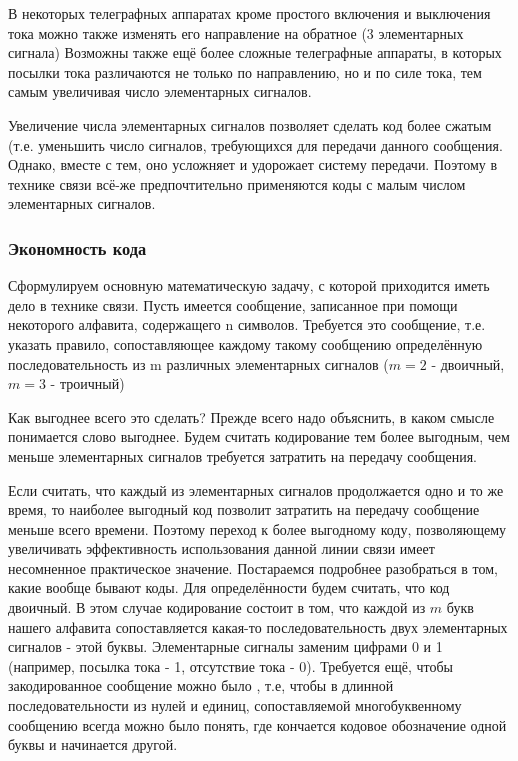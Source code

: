 \documentclass[a4paper,12pt]{report}
\begin{document}
	В некоторых телеграфных аппаратах кроме простого включения и выключения тока можно также изменять его направление на обратное (3 элементарных сигнала) Возможны также ещё более сложные телеграфные аппараты, в которых посылки тока различаются не только по направлению, но и по силе тока, тем самым увеличивая число элементарных сигналов.
	
	Увеличение числа элементарных сигналов позволяет сделать код более сжатым (т.е. уменьшить число сигналов, требующихся для передачи данного сообщения. Однако, вместе с тем, оно усложняет и удорожает систему передачи. Поэтому в технике связи всё-же предпочтительно применяются коды с малым числом элементарных сигналов.
		

	\subsubsection{Экономность кода}
	
	Сформулируем основную математическую задачу, с которой приходится иметь дело в технике связи. Пусть имеется сообщение, записанное при помощи некоторого алфавита, содержащего n символов. Требуется  это сообщение, т.е. указать правило, сопоставляющее каждому такому сообщению определённую последовательность из m различных элементарных сигналов ($m=2$ - двоичный, $m=3$ - троичный)
	
	Как выгоднее всего это сделать?  Прежде всего надо объяснить, в каком смысле понимается слово выгоднее. Будем считать кодирование тем более выгодным, чем меньше элементарных сигналов требуется затратить на передачу сообщения. 
	
	Если считать, что каждый из элементарных сигналов продолжается одно и то же время, то наиболее выгодный код позволит затратить на передачу сообщение меньше всего времени. Поэтому переход к более выгодному коду, позволяющему увеличивать эффективность использования данной линии связи имеет несомненное практическое значение. Постараемся подробнее разобраться в том, какие вообще бывают коды. Для определённости будем считать, что код двоичный. В этом случае кодирование состоит в том, что каждой из $m$ букв нашего алфавита сопоставляется какая-то последовательность двух элементарных сигналов -  этой буквы. Элементарные сигналы заменим цифрами 0 и 1 (например, посылка тока - 1, отсутствие тока - 0). Требуется ещё, чтобы закодированное сообщение можно было , т.е, чтобы в длинной последовательности из нулей и единиц, сопоставляемой многобуквенному сообщению всегда можно было понять, где кончается кодовое обозначение одной буквы и начинается другой.
\end{document}
